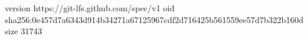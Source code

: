 version https://git-lfs.github.com/spec/v1
oid sha256:0e457d7a6343d914b34271a67125967cdf2d716425b561559ee57d7b322b160d
size 31743
